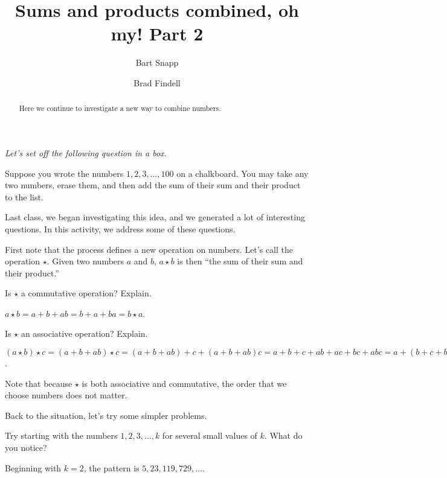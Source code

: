 \documentclass{ximera}
\title{Sums and products combined, oh my!  Part 2}
\author{Bart Snapp \and Brad Findell}
\begin{document}
\begin{abstract}
Here we continue to investigate a new way to combine numbers.
\end{abstract}
\maketitle

\emph{Let's set off the following question in a box.} 

Suppose you wrote the numbers $1,2,3,\dots,100$ on a chalkboard. You
may take any two numbers, erase them, and then add the sum of their
sum and their product to the list.

Last class, we began investigating this idea, and we generated a lot of interesting questions.  
In this activity, we address some of these questions.  

First note that the process defines a new operation on numbers.  Let's call the operation $\star$.  Given two numbers $a$ and $b$,  $a\star b$ is then ``the sum of their sum and their product.''    

\begin{problem}
Is $\star$ a commutative operation?  Explain.  
\begin{freeResponse}
$a\star b = a+b+ab= b+a+ba = b\star a$.  
\end{freeResponse}
\vfill
\end{problem}

\begin{problem}
Is $\star$ an associative operation?  Explain.  
\begin{freeResponse}
$(a\star b)\star c = (a+b+ab)\star c = (a+b+ab)+c + (a+b+ab)c 
= a + b + c + ab + ac + bc + abc = a+(b+c+bc) + a(b+c+bc) =
a\star (b+c+bc) = a \star(b\star c)$.  

Note that because $\star$ is both associative 
and commutative, the order that we choose numbers does not matter.  
\end{freeResponse}
\vfill
\end{problem}

\newpage
Back to the situation, let's try some simpler problems.  

\begin{problem}
Try starting with the numbers $1,2,3,\dots, k$ for several small values of $k$.  What do you notice?  
\begin{freeResponse}
Beginning with $k = 2$, the pattern is $5, 23, 119, 729, \dots$.  
\end{freeResponse}
\vfill
\end{problem}
\end{document}
